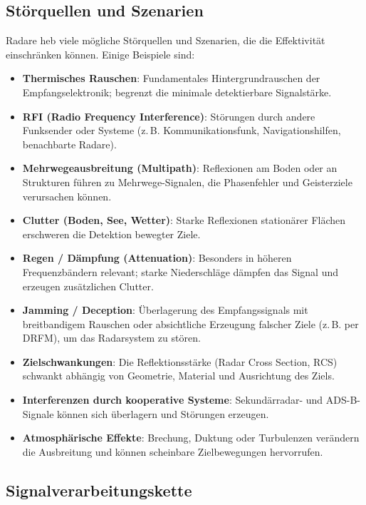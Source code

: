 \subsection{Störquellen und Szenarien}
Radare heb viele mögliche Störquellen und Szenarien, die die Effektivität einschränken können.
Einige Beispiele sind:
\begin{itemize}
  \item \textbf{Thermisches Rauschen}: Fundamentales Hintergrundrauschen der Empfangselektronik; begrenzt die minimale detektierbare Signalstärke.
  \item \textbf{RFI (Radio Frequency Interference)}: Störungen durch andere Funksender oder Systeme (z.\,B. Kommunikationsfunk, Navigationshilfen, benachbarte Radare).
  \item \textbf{Mehrwegeausbreitung (Multipath)}: Reflexionen am Boden oder an Strukturen führen zu Mehrwege-Signalen, die Phasenfehler und Geisterziele verursachen können.
  \item \textbf{Clutter (Boden, See, Wetter)}: Starke Reflexionen stationärer Flächen erschweren die Detektion bewegter Ziele.
  \item \textbf{Regen / Dämpfung (Attenuation)}: Besonders in höheren Frequenzbändern relevant; starke Niederschläge dämpfen das Signal und erzeugen zusätzlichen Clutter.
  \item \textbf{Jamming / Deception}: Überlagerung des Empfangssignals mit breitbandigem Rauschen oder absichtliche Erzeugung falscher Ziele (z.\,B. per DRFM), um das Radarsystem zu stören.
  \item \textbf{Zielschwankungen}: Die Reflektionsstärke (Radar Cross Section, RCS) schwankt abhängig von Geometrie, Material und Ausrichtung des Ziels.
  \item \textbf{Interferenzen durch kooperative Systeme}: Sekundärradar- und ADS-B-Signale können sich überlagern und Störungen erzeugen.
  \item \textbf{Atmosphärische Effekte}: Brechung, Duktung oder Turbulenzen verändern die Ausbreitung und können scheinbare Zielbewegungen hervorrufen.
\end{itemize}

\subsection{Signalverarbeitungskette}
\usetikzlibrary{arrows.meta, positioning}

